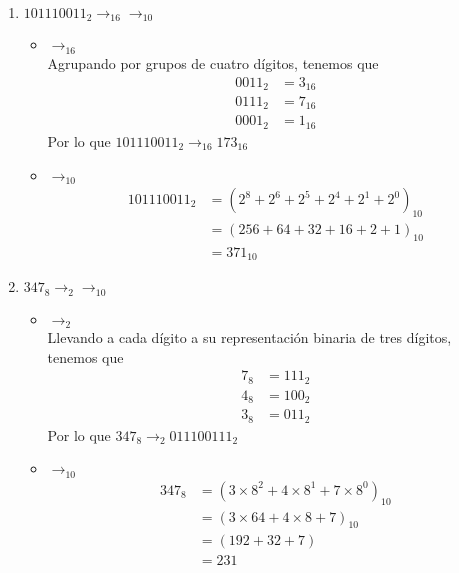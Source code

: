 \documentclass{article}
\begin{document}
    \begin{enumerate}
        \item {
            $101110011_2 \rightarrow_{16} \rightarrow_{10}$
            \begin{itemize}
                \item {
                    $\rightarrow_{16}$ \\
                    Agrupando por grupos de cuatro dígitos, tenemos que 
                    \begin{align*}
                        0011_2 &= 3_{16} \\
                        0111_2 &= 7_{16} \\
                        0001_2 &= 1_{16}
                    \end{align*}
                    Por lo que $101110011_2 \rightarrow_{16} 173_{16}$
                }
                \item {
                    $\rightarrow_{10}$
                    \begin{align*}
                        101110011_2 &= (2^8 + 2^6 + 2^5 + 2^4 + 2^1 + 2^0)_{10} \\
                                    &= (256+64+32+16+2+1)_{10} \\
                                    &= 371_{10}
                    \end{align*}

                }
            \end{itemize}
        }
        \item {
             $347_8 \rightarrow_2 \rightarrow_{10}$
            \begin{itemize}
                \item {
                    $\rightarrow_{2}$ \\
                    Llevando a cada dígito a su representación binaria de tres dígitos, 
                    tenemos que 
                    \begin{align*}
                        7_{8} &= 111_{2} \\
                        4_{8} &= 100_{2} \\
                       3_{8} &= 011_{2}
                     \end{align*}
                    Por lo que $347_8 \rightarrow_2 011100111_{2}$
                }
                \item {
                    $\rightarrow_{10}$
                    \begin{align*}
                        347_{8} &= (3 \times 8^2 + 4 \times 8^1 + 7 \times 8^0)_{10} \\
                                    &= (3 \times 64 + 4 \times 8 + 7)_{10} \\
                                    &= (192 + 32 + 7) \\
                                    &= 231
                    \end{align*}

}
\end{itemize}}
\end{enumerate}
\end{document}

